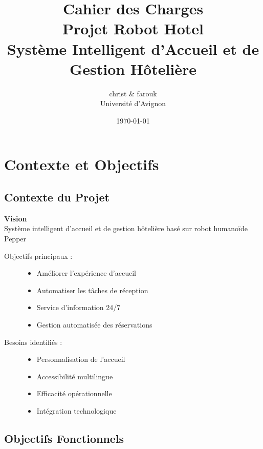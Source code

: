 \documentclass[12pt,a4paper]{article}
\title{
    \vspace{2cm}
    {\Huge\bfseries Cahier des Charges}\\
    \vspace{0.5cm}
    {\Large Projet Robot Hotel}\\
    \vspace{0.3cm}
    {\large Système Intelligent d'Accueil et de Gestion Hôtelière}
    \vspace{1.5cm}
}
\author{
    christ \& farouk\\
    Université d'Avignon
}
\date{\today}
\newenvironment{block}[1]{\begin{center}\begin{minipage}{0.9\textwidth}\textbf{#1}\\}{\end{minipage}\end{center}}
\begin{document}
\maketitle
\thispagestyle{empty}
\newpage

\tableofcontents
\newpage


\section{Contexte et Objectifs}

\subsection{Contexte du Projet}

\begin{block}{Vision}
Système intelligent d'accueil et de gestion hôtelière basé sur robot humanoïde Pepper
\end{block}

\begin{description}
\item[Objectifs principaux :]
\begin{itemize}
    \item Améliorer l'expérience d'accueil
    \item Automatiser les tâches de réception
    \item Service d'information 24/7
    \item Gestion automatisée des réservations
\end{itemize}

\item[Besoins identifiés :]
\begin{itemize}
    \item Personnalisation de l'accueil
    \item Accessibilité multilingue
    \item Efficacité opérationnelle
    \item Intégration technologique
\end{itemize}
\end{description}

\subsection{Objectifs Fonctionnels}
\end{document}

